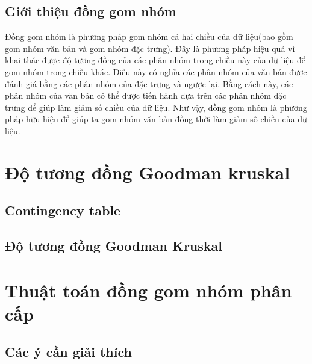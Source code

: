 	\subsection{Giới thiệu đồng gom nhóm}
	Đồng gom nhóm là phương pháp gom nhóm cả hai chiều của dữ liệu(bao gồm gom nhóm văn bản và gom nhóm đặc trưng).
	Đây là phương pháp hiệu quả vì khai thác được độ tương đồng của các phân nhóm trong chiều này của dữ liệu để gom nhóm trong chiều khác.
	Điều này có nghĩa các phân nhóm của văn bản được đánh giá bằng các phân nhóm của đặc trưng và ngược lại.
	Bằng cách này, các phân nhóm của văn bản có thể được tiến hành dựa trên các phân nhóm đặc trưng để giúp làm giảm số chiều của dữ liệu.
	Như vậy, đồng gom nhóm là phương pháp hữu hiệu để giúp ta gom nhóm văn bản đồng thời làm giảm số chiều của dữ liệu.


\section{Độ tương đồng Goodman kruskal}

	\subsection{Contingency table}
	
	\subsection{Độ tương đồng Goodman Kruskal}

\section{Thuật toán đồng gom nhóm phân cấp}
	\subsection{Các ý cần giải thích}
	
